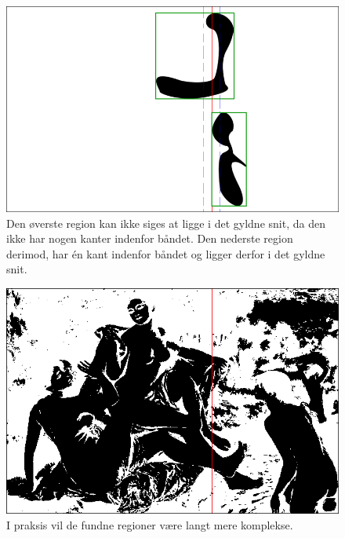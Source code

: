 {\begin{figure}[h]
	\begin{center}
		\includegraphics[scale=\imgscale,angle=0]{afsnit/vores_implementation/billeder/naiv_algoritme/bbox_section}
	\end{center}
	\caption[Afgrænsende rektangler]{Den øverste region kan ikke
	siges at ligge i det gyldne snit, da den ikke har nogen kanter
	indenfor båndet. Den nederste region derimod, har én kant
	indenfor båndet og ligger derfor i det gyldne snit.}
	\label{bbox_section}
\end{figure}

\begin{figure}[!h]
	\begin{center}
		\includegraphics[scale=0.42,angle=0]{afsnit/vores_implementation/billeder/naiv_algoritme/bathers_mockup_blob}
	\end{center}
	\caption[Interessante regioner i praksis]{I praksis vil de
	fundne regioner være langt mere komplekse.}
	\label{realworld_example}
\end{figure}

}
